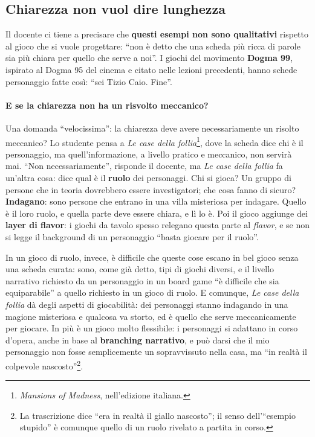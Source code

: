 \subsection{Chiarezza non vuol dire lunghezza}

Il docente ci tiene a precisare che \textbf{questi esempi non sono qualitativi}
rispetto al gioco che si vuole progettare: ``non è detto che una scheda più ricca di
parole sia più chiara per quello che serve a noi''. I giochi del movimento
\textbf{Dogma 99}, ispirato al Dogma 95 del cinema e citato nelle lezioni
precedenti, hanno schede personaggio fatte così: ``sei Tizio Caio. Fine''.

\paragraph{E se la chiarezza non ha un risvolto meccanico?} Una domanda ``velocissima'':
la chiarezza deve avere necessariamente un risolto meccanico? Lo studente pensa a
\emph{Le case della follia}\footnote{\emph{Mansions of Madness}, nell'edizione
italiana.}, dove la scheda dice chi è il personaggio, ma quell'informazione, a
livello pratico e meccanico, non servirà mai. ``Non necessariamente'', risponde il
docente, ma \emph{Le case della follia} fa un'altra cosa: dice qual è il
\textbf{ruolo} dei personaggi. Chi si gioca? Un gruppo di persone che in teoria
dovrebbero essere investigatori; che cosa fanno di sicuro? \textbf{Indagano}: sono
persone che entrano in una villa misteriosa per indagare. Quello è il loro ruolo, e
quella parte deve essere chiara, e lì lo è. Poi il gioco aggiunge dei
\textbf{layer di flavor}: i giochi da tavolo spesso relegano questa parte al
\emph{flavor}, e se non si legge il background di un personaggio ``basta giocare per
il ruolo''.

In un gioco di ruolo, invece, è difficile che queste cose escano in bel gioco senza
una scheda curata: sono, come già detto, tipi di giochi diversi, e il livello
narrativo richiesto da un personaggio in un board game ``è difficile che sia
equiparabile'' a quello richiesto in un gioco di ruolo. E comunque, \emph{Le case
della follia} dà degli aspetti di giocabilità: dei personaggi stanno indagando in
una magione misteriosa e qualcosa va storto, ed è quello che serve meccanicamente
per giocare. In più è un gioco molto flessibile: i personaggi si adattano in corso
d'opera, anche in base al \textbf{branching narrativo}, e può darsi che il mio
personaggio non fosse semplicemente un sopravvissuto nella casa, ma ``in realtà il
colpevole nascosto''\footnote{La trascrizione dice ``era in realtà il giallo
nascosto''; il senso dell'``esempio stupido'' è comunque quello di un ruolo
rivelato a partita in corso.}.

